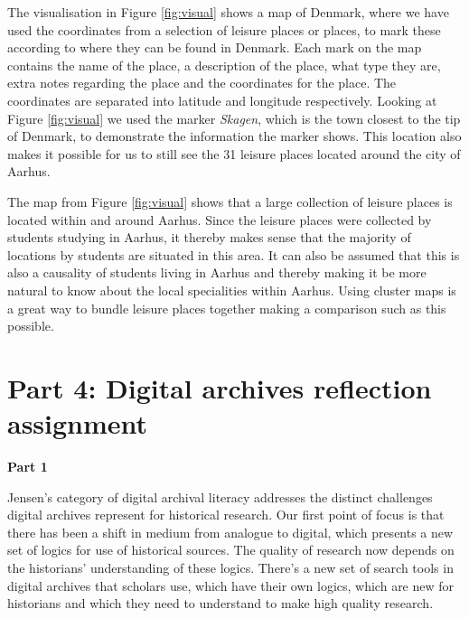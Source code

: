 \documentclass[%
  final,  %
  12pt,  %
  british,
  a4paper
]{article}
\begin{document}
\noindent The visualisation in Figure \ref{fig:visual} shows a map of Denmark, where we have used the coordinates from a selection of leisure places or places, to mark these according to where they can be found in Denmark. Each mark on the map contains the name of the place, a description of the place, what type they are, extra notes regarding the place and the coordinates for the place. The coordinates are separated into latitude and longitude respectively. Looking at Figure \ref{fig:visual} we used the marker \textit{Skagen}, which is the town closest to the tip of Denmark, to demonstrate the information the marker shows. This location also makes it possible for us to still see the 31 leisure places located around the city of Aarhus. 

The map from Figure \ref{fig:visual} shows that a large collection of leisure places is located within and around Aarhus. Since the leisure places were collected by students studying in Aarhus, it thereby makes sense that the majority of locations by students are situated in this area. It can also be assumed that this is also a causality of students living in Aarhus and thereby making it be more natural to know about the local specialities within Aarhus. Using cluster maps is a great way to bundle leisure places together making a comparison such as this possible.

\section*{Part 4: Digital archives reflection assignment}

\noindent\textbf{Part 1}

\noindent Jensen's category of digital archival literacy addresses the distinct challenges digital archives represent for historical research. Our first point of focus is that there has been a shift in medium from analogue to digital, which presents a new set of logics for use of historical sources. The quality of research now depends on the historians’ understanding of these logics. There’s a new set of search tools in digital archives that scholars use, which have their own logics, which are new for historians and which they need to understand to make high quality research. 
\end{document}
